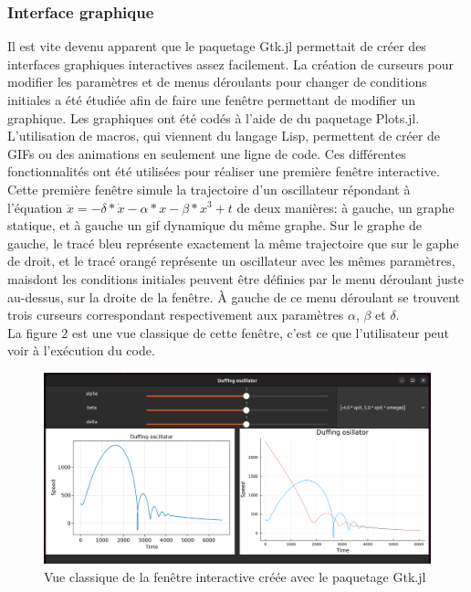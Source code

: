 \documentclass[a4paper, french, 12pt, titlepage]{article}
\begin{document}
\subsubsection{Interface graphique}

Il est vite devenu apparent que le paquetage Gtk.jl permettait de créer des interfaces graphiques interactives assez facilement. La création de curseurs pour modifier les paramètres et de menus déroulants pour changer de conditions initiales a été étudiée afin de faire une fenêtre permettant de modifier un graphique. Les graphiques ont été codés à l'aide de du paquetage Plots.jl. L'utilisation de macros, qui viennent du langage Lisp, permettent de créer de GIFs ou des animations en seulement une ligne de code. Ces différentes fonctionnalités ont été utilisées pour réaliser une première fenêtre interactive. Cette première fenêtre simule la trajectoire d'un oscillateur répondant à l'équation $\ddot x = - \delta * \dot x - \alpha * x - \beta * x^3 + t $ de deux manières: à gauche, un graphe statique, et à gauche un gif dynamique du même graphe. Sur le graphe de gauche, le tracé bleu représente exactement la même trajectoire que sur le gaphe de droit, et le tracé orangé représente un oscillateur avec les mêmes paramètres, maisdont les conditions initiales peuvent être définies par le menu déroulant juste au-dessus, sur la droite de la fenêtre. À gauche de ce menu déroulant se trouvent trois curseurs correspondant respectivement aux paramètres $\alpha$, $\beta$ et $\delta$. \\

La figure 2 est une vue classique de cette fenêtre, c'est ce que l'utilisateur peut voir à l'exécution du code.\\

\begin{figure}[htb]
  \includegraphics[width=\linewidth]{interactivewindow_1.png}
  \caption{Vue classique de la fenêtre interactive créée avec le paquetage Gtk.jl}
  \label{fig:organigramme}
\end{figure}
\end{document}
